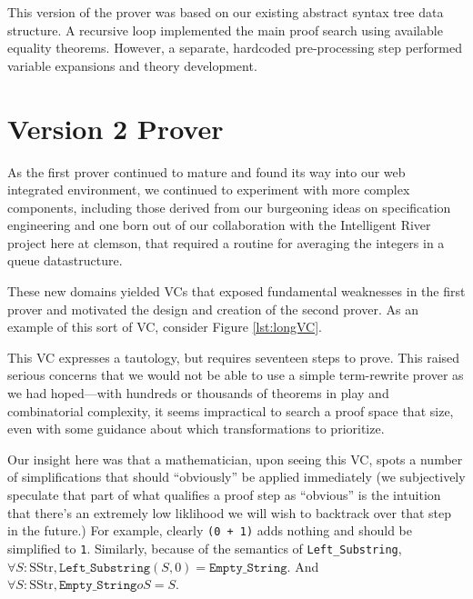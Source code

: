 This version of the prover was based on our existing abstract syntax tree data structure.  A recursive loop implemented the main proof search using available equality theorems.  However, a separate, hardcoded pre-processing step performed variable expansions and theory development.


\section{Version 2 Prover}

As the first prover continued to mature and found its way into our web integrated environment, we continued to experiment with more complex components, including those derived from our burgeoning ideas on specification engineering\cite{specEngineering} and one born out of our collaboration with the Intelligent River project here at clemson, that required a routine for averaging the integers in a queue datastructure\cite{queueAverage}.  

These new domains yielded VCs that exposed fundamental weaknesses in the first prover and motivated the design and creation of the second prover.  As an example of this sort of VC, consider Figure \ref{lst:longVC}.



This VC expresses a tautology, but requires seventeen steps to prove.  This raised serious concerns that we would not be able to use a simple term-rewrite prover as we had hoped---with hundreds or thousands of theorems in play and combinatorial complexity, it seems impractical to search a proof space that size, even with some guidance about which transformations to prioritize.

Our insight here was that a mathematician, upon seeing this VC, spots a number of simplifications that should ``obviously'' be applied immediately (we subjectively speculate that part of what qualifies a proof step as ``obvious'' is the intuition that there's an extremely low liklihood we will wish to backtrack over that step in the future.)  For example, clearly \texttt{(0 + 1)} adds nothing and should be simplified to \texttt{1}.  Similarly, because of the semantics of \texttt{Left\_Substring}, $\forall S : \text{SStr}, \texttt{Left\_Substring}(S, 0) = \texttt{Empty\_String}$.  And $\forall S : \text{SStr}, \texttt{Empty\_String} o S = S$.

